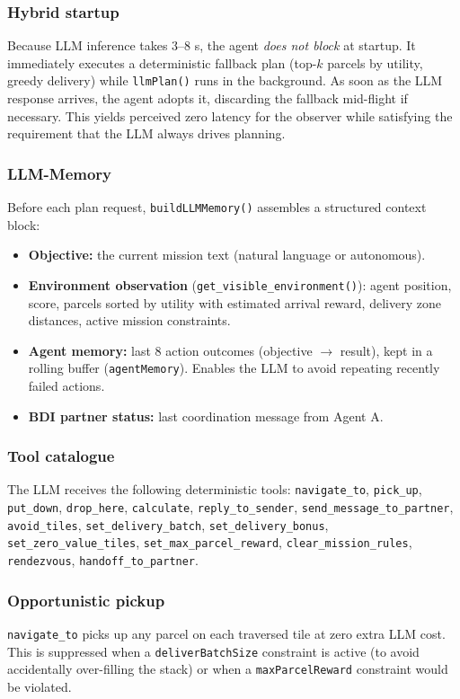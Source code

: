 \documentclass[10pt,a4paper,twocolumn]{article}
\begin{document}
\subsubsection*{Hybrid startup}
Because LLM inference takes 3--8 s, the agent \emph{does not block} at startup.
It immediately executes a deterministic fallback plan (top-$k$ parcels by
utility, greedy delivery) while \texttt{llmPlan()} runs in the background.  As
soon as the LLM response arrives, the agent adopts it, discarding the fallback
mid-flight if necessary.  This yields perceived zero latency for the observer
while satisfying the requirement that the LLM always drives planning.

\subsubsection*{LLM-Memory}
Before each plan request, \texttt{buildLLMMemory()} assembles a structured
context block:
\begin{itemize}[noitemsep]
  \item \textbf{Objective:} the current mission text (natural language or
        autonomous).
  \item \textbf{Environment observation} (\texttt{get\_visible\_environment()}):
        agent position, score, parcels sorted by utility with estimated arrival
        reward, delivery zone distances, active mission constraints.
  \item \textbf{Agent memory:} last 8 action outcomes (objective $\to$ result),
        kept in a rolling buffer (\texttt{agentMemory}).  Enables the LLM to
        avoid repeating recently failed actions.
  \item \textbf{BDI partner status:} last coordination message from Agent A.
\end{itemize}

\subsubsection*{Tool catalogue}
The LLM receives the following deterministic tools:
\texttt{navigate\_to}, \texttt{pick\_up}, \texttt{put\_down},
\texttt{drop\_here}, \texttt{calculate}, \texttt{reply\_to\_sender},
\texttt{send\_message\_to\_partner},
\texttt{avoid\_tiles}, \texttt{set\_delivery\_batch},
\texttt{set\_delivery\_bonus}, \texttt{set\_zero\_value\_tiles},
\texttt{set\_max\_parcel\_reward}, \texttt{clear\_mission\_rules},
\texttt{rendezvous}, \texttt{handoff\_to\_partner}.

\subsubsection*{Opportunistic pickup}
\texttt{navigate\_to} picks up any parcel on each traversed tile at zero extra
LLM cost.  This is suppressed when a \texttt{deliverBatchSize} constraint is
active (to avoid accidentally over-filling the stack) or when a
\texttt{maxParcelReward} constraint would be violated.
\end{document}
